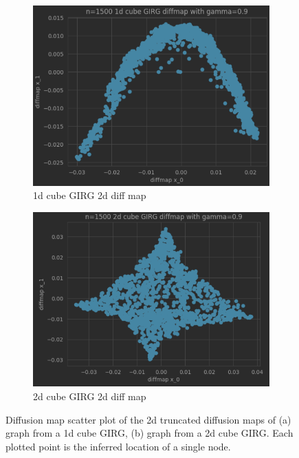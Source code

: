 \begin{figure}
  \centering

  \begin{subfigure}{0.49\textwidth}
    \centering
    \includegraphics[width=\linewidth]{figures/1d_GIRG_diffmap.png}
    \caption{1d cube GIRG 2d diff map}
    \label{fig:sub1}
  \end{subfigure}
  \hfill
  \begin{subfigure}{0.49\textwidth}
    \centering
    \includegraphics[width=\linewidth]{figures/2d_GIRG_diffmap.png}
    \caption{2d cube GIRG 2d diff map}
    \label{fig:cube_diffmap_plots_d2}
  \end{subfigure}


  \caption{Diffusion map scatter plot of the 2d truncated diffusion maps of (a) graph from a 1d cube GIRG, (b) graph from a 2d cube GIRG. Each plotted point is the inferred location of a single node. }
  \label{fig:cube_diffmap_plots_d1and2}
\end{figure}

